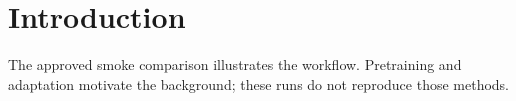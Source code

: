 \section{Introduction}
The approved smoke comparison illustrates the workflow. Pretraining and adaptation motivate the background\cite{devlin2019bert,hu2022lora}; these runs do not reproduce those methods.
